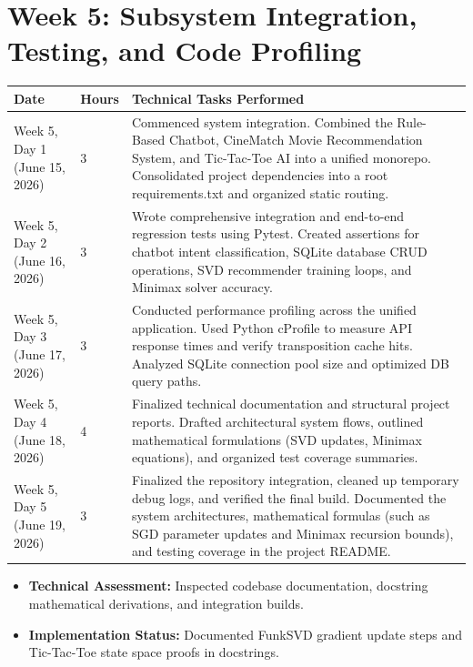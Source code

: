 \documentclass[11pt,a4paper]{article}
\begin{document}
\newpage

\section*{Week 5: Subsystem Integration, Testing, and Code Profiling}
\begin{longtable}{L{2.8cm} C{1.2cm} L{10.5cm}}
    \toprule
    \textbf{Date} & \textbf{Hours} & \textbf{Technical Tasks Performed} \\
    \midrule
    \endhead
    \bottomrule
    \endfoot
    \bottomrule
    \endlastfoot
    Week 5, Day 1 \newline (June 15, 2026) & 3 & Commenced system integration. Combined the Rule-Based Chatbot, CineMatch Movie Recommendation System, and Tic-Tac-Toe AI into a unified monorepo. Consolidated project dependencies into a root requirements.txt and organized static routing. \\
    \addlinespace
    Week 5, Day 2 \newline (June 16, 2026) & 3 & Wrote comprehensive integration and end-to-end regression tests using Pytest. Created assertions for chatbot intent classification, SQLite database CRUD operations, SVD recommender training loops, and Minimax solver accuracy. \\
    \addlinespace
    Week 5, Day 3 \newline (June 17, 2026) & 3 & Conducted performance profiling across the unified application. Used Python cProfile to measure API response times and verify transposition cache hits. Analyzed SQLite connection pool size and optimized DB query paths. \\
    \addlinespace
    Week 5, Day 4 \newline (June 18, 2026) & 4 & Finalized technical documentation and structural project reports. Drafted architectural system flows, outlined mathematical formulations (SVD updates, Minimax equations), and organized test coverage summaries. \\
    \addlinespace
    Week 5, Day 5 \newline (June 19, 2026) & 3 & Finalized the repository integration, cleaned up temporary debug logs, and verified the final build. Documented the system architectures, mathematical formulas (such as SGD parameter updates and Minimax recursion bounds), and testing coverage in the project README. \\
\end{longtable}

\begin{tcolorbox}[colback=gray!5!white,colframe=gray!60!black,title=Weekly Review (Week 5)]
    \begin{itemize}
        \item \textbf{Technical Assessment:} Inspected codebase documentation, docstring mathematical derivations, and integration builds.
        \item \textbf{Implementation Status:} Documented FunkSVD gradient update steps and Tic-Tac-Toe state space proofs in docstrings.
    \end{itemize}
\end{tcolorbox}
\end{document}
